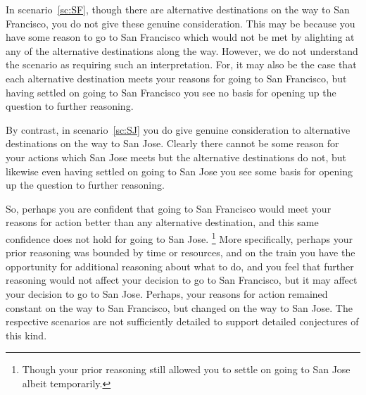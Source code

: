 \documentclass[10pt]{article}
\begin{document}
In scenario~\ref{sc:SF}, though there are alternative destinations on the way to San Francisco, you do not give these genuine consideration.
This may be because you have some reason to go to San Francisco which would not be met by alighting at any of the alternative destinations along the way.
However, we do not understand the scenario as  requiring such an interpretation.
For, it may also be the case that each alternative destination meets your reasons for going to San Francisco, but having settled on going to San Francisco you see no basis for opening up the question to further reasoning.

By contrast, in scenario~\ref{sc:SJ} you do give genuine consideration to alternative destinations on the way to San Jose.
Clearly there cannot be some reason for your actions which San Jose meets but the alternative destinations do not, but likewise even having settled on going to San Jose you see some basis for opening up the question to further reasoning.

So, perhaps you are confident that going to San Francisco would meet your reasons for action better than any alternative destination, and this same confidence does not hold for going to San Jose.
\footnote{Though your prior reasoning still allowed you to settle on going to San Jose albeit temporarily.}
More specifically, perhaps your prior reasoning was bounded by time or resources, and on the train you have the opportunity for additional reasoning about what to do, and you feel that further reasoning would not affect your decision to go to San Francisco, but it may affect your decision to go to San Jose.
Perhaps, your reasons for action remained constant on the way to San Francisco, but changed on the way to San Jose.
The respective scenarios are not sufficiently detailed to support detailed conjectures of this kind.
\end{document}
